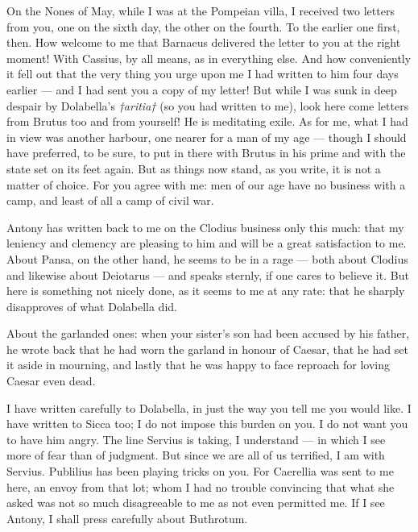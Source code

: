

 On the Nones of May, while I was at the Pompeian villa, I received two letters from you, one on the sixth day, the other on the fourth. To the earlier one first, then. How welcome to me that Barnaeus delivered the letter to you at the right moment! With Cassius, by all means, as in everything else. And how conveniently it fell out that the very thing you urge upon me I had written to him four days earlier --- and I had sent you a copy of my letter! But while I was sunk in deep despair by Dolabella's \textit{†aritia†} (so you had written to me), look here come letters from Brutus too and from yourself! He is meditating exile. As for me, what I had in view was another harbour, one nearer for a man of my age --- though I should have preferred, to be sure, to put in there with Brutus in his prime and with the state set on its feet again. But as things now stand, as you write, it is not a matter of choice. For you agree with me: men of our age have no business with a camp, and least of all a camp of civil war.

 Antony has written back to me on the Clodius business only this much: that my leniency and clemency are pleasing to him and will be a great satisfaction to me. About Pansa, on the other hand, he seems to be in a rage --- both about Clodius and likewise about Deiotarus --- and speaks sternly, if one cares to believe it. But here is something not nicely done, as it seems to me at any rate: that he sharply disapproves of what Dolabella did.

 About the garlanded ones: when your sister's son had been accused by his father, he wrote back that he had worn the garland in honour of Caesar, that he had set it aside in mourning, and lastly that he was happy to face reproach for loving Caesar even dead.

 I have written carefully to Dolabella, in just the way you tell me you would like. I have written to Sicca too; I do not impose this burden on you. I do not want you to have him angry. The line Servius is taking, I understand --- in which I see more of fear than of judgment. But since we are all of us terrified, I am with Servius. Publilius has been playing tricks on you. For Caerellia was sent to me here, an envoy from that lot; whom I had no trouble convincing that what she asked was not so much disagreeable to me as not even permitted me. If I see Antony, I shall press carefully about Buthrotum.

